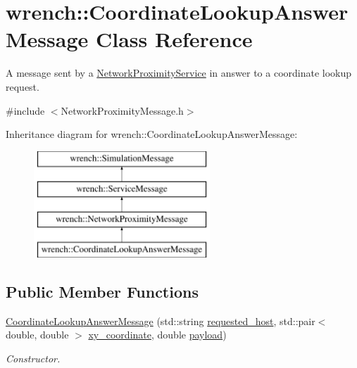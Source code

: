 \hypertarget{classwrench_1_1_coordinate_lookup_answer_message}{}\section{wrench\+:\+:Coordinate\+Lookup\+Answer\+Message Class Reference}
\label{classwrench_1_1_coordinate_lookup_answer_message}


A message sent by a \hyperlink{classwrench_1_1_network_proximity_service}{Network\+Proximity\+Service} in answer to a coordinate lookup request.  




{\ttfamily \#include $<$Network\+Proximity\+Message.\+h$>$}

Inheritance diagram for wrench\+:\+:Coordinate\+Lookup\+Answer\+Message\+:\begin{figure}[H]
\begin{center}
\leavevmode
\includegraphics[height=4.000000cm]{classwrench_1_1_coordinate_lookup_answer_message}
\end{center}
\end{figure}
\subsection*{Public Member Functions}
\begin{DoxyCompactItemize}
\item 
\hyperlink{classwrench_1_1_coordinate_lookup_answer_message_ad32d9253fbb49913d426fa68285fb90f}{Coordinate\+Lookup\+Answer\+Message} (std\+::string \hyperlink{classwrench_1_1_coordinate_lookup_answer_message_a2df7247a445efa620e8c3a0161109be1}{requested\+\_\+host}, std\+::pair$<$ double, double $>$ \hyperlink{classwrench_1_1_coordinate_lookup_answer_message_acc1e9708cb8c9127d480415ca4d3452e}{xy\+\_\+coordinate}, double \hyperlink{classwrench_1_1_simulation_message_a914f2732713f7c02898e66f05a7cb8a1}{payload})
\begin{DoxyCompactList}\small\item\em Constructor. \end{DoxyCompactList}\end{DoxyCompactItemize}
